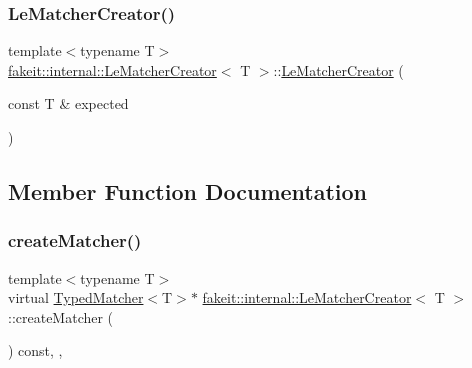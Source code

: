 \mbox{\label{structfakeit_1_1internal_1_1LeMatcherCreator_a58c849c7f94f5a3fd319b267173cee2b}} 
\subsubsection{\texorpdfstring{LeMatcherCreator()}{LeMatcherCreator()}\hspace{0.1cm}{\footnotesize\ttfamily [9/9]}}
{\footnotesize\ttfamily template$<$typename T$>$ \\
\mbox{\hyperlink{structfakeit_1_1internal_1_1LeMatcherCreator}{fakeit\+::internal\+::\+Le\+Matcher\+Creator}}$<$ T $>$\+::\mbox{\hyperlink{structfakeit_1_1internal_1_1LeMatcherCreator}{Le\+Matcher\+Creator}} (\begin{DoxyParamCaption}\item[{const T \&}]{expected }\end{DoxyParamCaption})\hspace{0.3cm}{\ttfamily [inline]}}



\subsection{Member Function Documentation}
\mbox{\label{structfakeit_1_1internal_1_1LeMatcherCreator_a413d0c534701c79a96648111a337f270}} 
\subsubsection{\texorpdfstring{createMatcher()}{createMatcher()}\hspace{0.1cm}{\footnotesize\ttfamily [1/9]}}
{\footnotesize\ttfamily template$<$typename T$>$ \\
virtual \mbox{\hyperlink{structfakeit_1_1TypedMatcher}{Typed\+Matcher}}$<$T$>$$\ast$ \mbox{\hyperlink{structfakeit_1_1internal_1_1LeMatcherCreator}{fakeit\+::internal\+::\+Le\+Matcher\+Creator}}$<$ T $>$\+::create\+Matcher (\begin{DoxyParamCaption}{ }\end{DoxyParamCaption}) const\hspace{0.3cm}{\ttfamily [inline]}, {\ttfamily [override]}, {\ttfamily [virtual]}}



